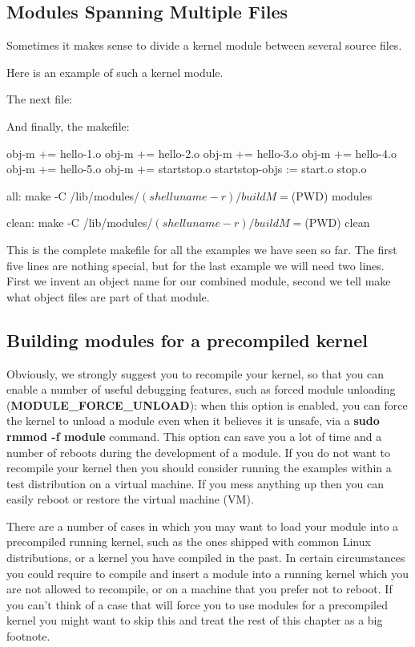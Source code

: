 \documentclass[10pt, oneside]{book}
\begin{document}
\subsection{Modules Spanning Multiple Files}
\label{modfiles}
Sometimes it makes sense to divide a kernel module between several source files.

Here is an example of such a kernel module.

The next file:

And finally, the makefile:

\begin{code}
obj-m += hello-1.o
obj-m += hello-2.o
obj-m += hello-3.o
obj-m += hello-4.o
obj-m += hello-5.o
obj-m += startstop.o
startstop-objs := start.o stop.o

all:
	make -C /lib/modules/$(shell uname -r)/build M=$(PWD) modules

clean:
	make -C /lib/modules/$(shell uname -r)/build M=$(PWD) clean
\end{code}

This is the complete makefile for all the examples we have seen so far.
The first five lines are nothing special, but for the last example we will need two lines.
First we invent an object name for our combined module, second we tell make what object files are part of that module.

\subsection{Building modules for a precompiled kernel}
\label{precompiled}
Obviously, we strongly suggest you to recompile your kernel, so that you can enable a number of useful debugging features, such as forced module unloading (\textbf{MODULE\_FORCE\_UNLOAD}): when this option is enabled, you can force the kernel to unload a module even when it believes it is unsafe, via a \textbf{sudo rmmod -f module} command.
This option can save you a lot of time and a number of reboots during the development of a module.
If you do not want to recompile your kernel then you should consider running the examples within a test distribution on a virtual machine.
If you mess anything up then you can easily reboot or restore the virtual machine (VM).

There are a number of cases in which you may want to load your module into a precompiled running kernel, such as the ones shipped with common Linux distributions, or a kernel you have compiled in the past.
In certain circumstances you could require to compile and insert a module into a running kernel which you are not allowed to recompile, or on a machine that you prefer not to reboot.
If you can't think of a case that will force you to use modules for a precompiled kernel you might want to skip this and treat the rest of this chapter as a big footnote.
\end{document}
